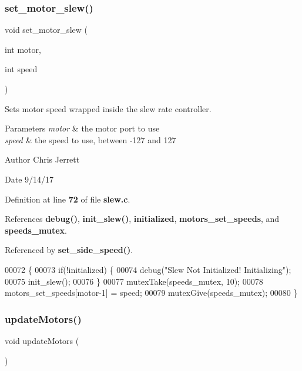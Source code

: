 \subsubsection{set\+\_\+motor\+\_\+slew()}
{\footnotesize\ttfamily void set\+\_\+motor\+\_\+slew (\begin{DoxyParamCaption}\item[{int}]{motor,  }\item[{int}]{speed }\end{DoxyParamCaption})}



Sets motor speed wrapped inside the slew rate controller. 


\begin{DoxyParams}{Parameters}
{\em motor} & the motor port to use \\
\hline
{\em speed} & the speed to use, between -\/127 and 127 \\
\hline
\end{DoxyParams}
\begin{DoxyAuthor}{Author}
Chris Jerrett 
\end{DoxyAuthor}
\begin{DoxyDate}{Date}
9/14/17 
\end{DoxyDate}


Definition at line \textbf{ 72} of file \textbf{ slew.\+c}.



References \textbf{ debug()}, \textbf{ init\+\_\+slew()}, \textbf{ initialized}, \textbf{ motors\+\_\+set\+\_\+speeds}, and \textbf{ speeds\+\_\+mutex}.



Referenced by \textbf{ set\+\_\+side\+\_\+speed()}.


\begin{DoxyCode}
00072                                          \{
00073   \textcolor{keywordflow}{if}(!initialized) \{
00074     debug(\textcolor{stringliteral}{"Slew Not Initialized! Initializing"});
00075     init_slew();
00076   \}
00077   mutexTake(speeds_mutex, 10);
00078   motors_set_speeds[motor-1] = speed;
00079   mutexGive(speeds_mutex);
00080 \}
\end{DoxyCode}
\mbox{\label{slew_8h_a807a87c5df438fde21c1e8213906695b}} 
\subsubsection{update\+Motors()}
{\footnotesize\ttfamily void update\+Motors (\begin{DoxyParamCaption}{ }\end{DoxyParamCaption})}



